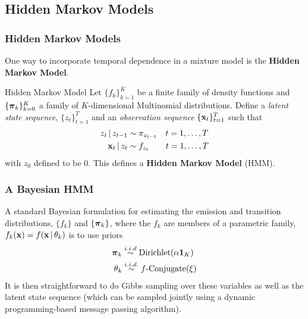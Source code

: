 \documentclass[11pt, serif, mathserif, table,trans]{beamer}
\begin{document}
\subsection{Hidden Markov Models}
\begin{frame}
  \frametitle{Hidden Markov Models}
  One way to incorporate temporal dependence in a mixture model is the
  {\bf Hidden Markov Model}.
  \begin{infoblock}{Hidden Markov Model}
    Let $\{f_k\}_{k=1}^K$ be a finite family of density functions and
    $\{\boldsymbol{\pi}_k\}_{k=0}^K$ a family of $K$-dimensional Multinomial
    distributions.  Define a {\em latent state
      sequence}, $\{z_t\}_{t=1}^T$ and an {\em observation sequence}
    $\{\mathbf{x}_t\}_{t=1}^T$ such that
    \begin{align}
      \label{eq:12}
      z_t \, \vert \, z_{t-1} &\sim \pi_{z_{t-1}} \quad t = 1, \dots, T \\
      \mathbf{x}_t \, \vert \, z_t &\sim f_{z_t} \qquad t = 1, \dots, T
    \end{align}
    with $z_0$ defined to be 0.  This defines a {\bf Hidden Markov
      Model} (HMM).
  \end{infoblock}
\end{frame}

\begin{frame}
  \frametitle{A Bayesian HMM}
  A standard Bayesian formulation for estimating the emission and
  transition distributions, $\{f_k\}$ and
  $\{\boldsymbol{\pi}_k\}$, where the $f_k$ are members of a parametric family,
  $f_k(\mathbf{x}) = f(\mathbf{x} \, \vert \, \theta_k)$ is to use priors
  \begin{align}
    \label{eq:5}
    \boldsymbol{\pi}_k &\stackrel{i.i.d}{\sim} \mathrm{Dirichlet}(\alpha\mathbf{1}_K) \\
    \theta_k &\stackrel{i.i.d.}{\sim} f\text{-}\mathrm{Conjugate}(\xi)
  \end{align}
  It is then straightforward to do Gibbs sampling over these variables
  as well as the latent state sequence (which can be sampled jointly
  using a dynamic programming-based message passing algorithm).
\end{frame}

\end{document}
